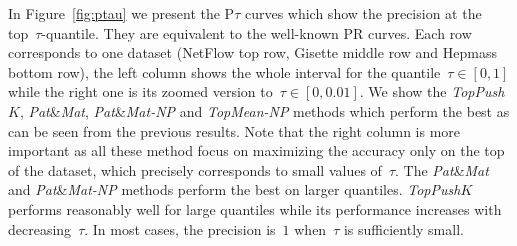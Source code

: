 \documentclass[11pt,a4paper]{article}
\theoremstyle{definition}
\newcommand{\toppushk}{\textit{TopPush$K$}\xspace}
\newcommand{\patmat}{\textit{Pat}\textup{\&}\textit{Mat}\xspace}
\newcommand{\patmatnp}{\textit{Pat}\textup{\&}\textit{Mat-NP}\xspace}
\newcommand{\topmeannp}{\textit{TopMean-NP}\xspace}
\begin{document}
\noindent In Figure~\ref{fig:ptau} we present the P$\tau$ curves which show the precision at the top~$\tau$-quantile. They are equivalent to the well-known PR curves. Each row corresponds to one dataset (NetFlow top row, Gisette middle row and Hepmass bottom row), the left column shows the whole interval for the quantile~$\tau\in[0,1]$ while the right one is its zoomed version to~$\tau\in[0,0.01].$ We show the \toppushk, \patmat, \patmatnp and \topmeannp methods which perform the best as can be seen from the previous results. Note that the right column is more important as all these method focus on maximizing the accuracy only on the top of the dataset, which precisely corresponds to small values of~$\tau.$ The \patmat and \patmatnp methods perform the best on larger quantiles. \toppushk performs reasonably well for large quantiles while its performance increases with decreasing~$\tau.$ In most cases, the precision is~$1$ when~$\tau$ is sufficiently small.
\end{document}
